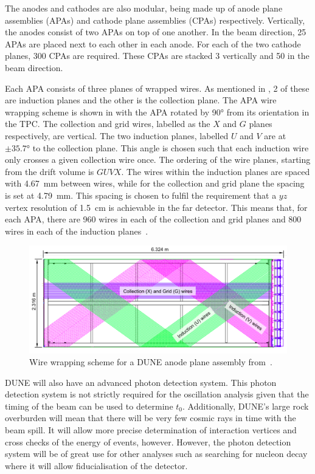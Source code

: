 The anodes and cathodes are also modular, being made up of anode plane assemblies (APAs) and cathode plane assemblies (CPAs) respectively.
Vertically, the anodes consist of two APAs on top of one another.
In the beam direction, 25 APAs are placed next to each other in each anode.
For each of the two cathode planes, 300 CPAs are required.
These CPAs are stacked 3 vertically and 50 in the beam direction.

Each APA consists of three planes of wrapped wires.
As mentioned in , 2 of these are induction planes and the other is the collection plane.
The APA wire wrapping scheme is shown in  with the APA rotated by \ang{90} from its orientation in the TPC.
The collection and grid wires, labelled as the $X$ and $G$ planes respectively, are vertical.
The two induction planes, labelled $U$ and $V$ are at $\pm\ang{35.7}$ to the collection plane.
This angle is chosen such that each induction wire only crosses a given collection wire once.
The ordering of the wire planes, starting from the drift volume is $GUVX$.
The wires within the induction planes are spaced with \SI{4.67}{\milli\metre} between wires, while for the collection and grid plane the spacing is set at \SI{4.79}{\milli\metre}.
This spacing is chosen to fulfil the requirement that a $yz$ vertex resolution of \SI{1.5}{\centi\metre} is achievable in the far detector.
This means that, for each APA, there are 960 wires in each of the collection and grid planes and 800 wires in each of the induction planes~\cite{tdrVol4}.

\begin{figure}[h]
  \centering
  \includegraphics[width=.95\linewidth]{files/figures/dune_detector/wireWrapping}
  \caption[Wire wrapping scheme for a DUNE anode plane assembly]{Wire wrapping scheme for a DUNE anode plane assembly from~\cite{tdrVol4}.}
  \label{fig:wireWrapping}
\end{figure}

DUNE will also have an advanced photon detection system.
This photon detection system is not strictly required for the oscillation analysis given that the timing of the beam can be used to determine $t_{0}$.
Additionally, DUNE's large rock overburden will mean that there will be very few cosmic rays in time with the beam spill.
It will allow more precise determination of interaction vertices and cross checks of the energy of events, however.
However, the photon detection system will be of great use for other analyses such as searching for nucleon decay where it will allow fiducialisation of the detector.

